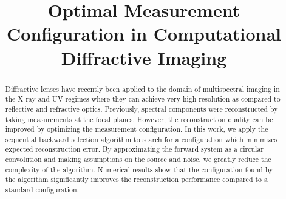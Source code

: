 \documentclass{article}
\title{Optimal Measurement Configuration in Computational \\ Diffractive Imaging}
\begin{document}
\maketitle

\begin{abstract}

Diffractive lenses have recently been applied to the domain of multispectral
imaging in the X-ray and UV regimes where they can achieve very high resolution
as compared to reflective and refractive optics. Previously, spectral components were reconstructed by taking measurements at the focal planes. However, the reconstruction quality can be improved by optimizing the measurement configuration. In this work, we apply the sequential backward selection
algorithm to search for a configuration which minimizes expected
reconstruction error. By approximating the forward system as a circular
convolution and making assumptions on the source and noise, we greatly reduce
the complexity of the algorithm. Numerical results show that the
configuration found by the algorithm significantly improves the reconstruction
performance compared to a standard configuration.

\end{abstract}
\end{document}
